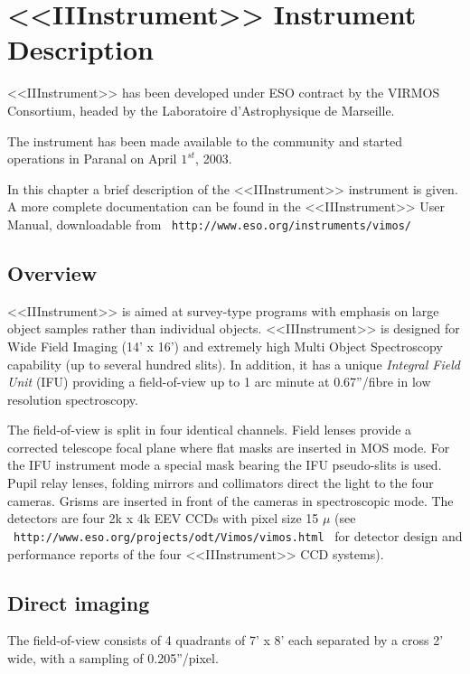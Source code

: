 \section{<<IIInstrument>> Instrument Description}
\label{INSTR}

<<IIInstrument>> has been developed under ESO contract by the VIRMOS Consortium, 
headed by the Laboratoire d'Astrophysique de Marseille. 

The instrument has been made available to the community and started 
operations in Paranal on April $1^{st}$, 2003.

In this chapter a brief description of the <<IIInstrument>> instrument is given.
A more complete documentation can be found in the <<IIInstrument>> User Manual,
downloadable from \ {\tt http://www.eso.org/instruments/vimos/}

\subsection{Overview}
\label{INSTR:OVER}

<<IIInstrument>> is aimed at survey-type programs with emphasis on large object samples 
rather than individual objects. <<IIInstrument>> is designed for Wide Field
Imaging (14' x 16') and extremely high Multi Object Spectroscopy 
capability (up to several hundred slits). In addition, it has a 
unique {\it Integral Field Unit} (IFU) providing a field-of-view 
up to 1 arc minute at 0.67''/fibre in low resolution spectroscopy. 

The field-of-view is split in four identical channels. Field lenses 
provide a corrected telescope focal plane where flat masks are 
inserted in MOS mode. For the IFU instrument mode a special
mask bearing the IFU pseudo-slits is used.
Pupil relay lenses, folding mirrors and collimators 
direct the light to the four cameras.
Grisms are inserted in front of the cameras in spectroscopic mode.
The detectors are four 2k x 4k EEV CCDs with pixel size 15 $\mu$ 
(see \ {\tt http://www.eso.org/projects/odt/Vimos/vimos.html} \ for 
detector design and performance reports of the four <<IIInstrument>> 
CCD systems).

\subsection{Direct imaging}

The field-of-view consists of 4 quadrants of 7' x 8' each separated 
by a cross 2' wide, with a sampling of 0.205''/pixel.

